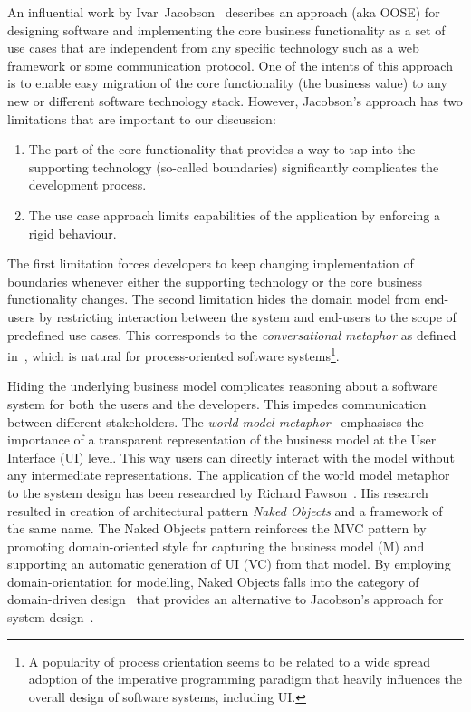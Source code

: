 \documentclass[a4paper,10pt,oneside,openright,final]{memoir} %
\begin{document}
    An influential work by Ivar~Jacobson~\cite{jacobson1992} describes an approach (aka OOSE) for designing software and implementing the core business functionality as a set of use cases that are independent from any specific technology such as a web framework or some communication protocol.
  	One of the intents of this approach is to enable easy migration of the core functionality (the business value) to any new or different software technology stack.
  	However, Jacobson's approach has two limitations that are important to our discussion:
	\begin{enumerate}
   		\item The part of the core functionality that provides a way to tap into the supporting technology (so-called boundaries) significantly complicates the development process.
   		\item The use case approach limits capabilities of the application by enforcing a rigid behaviour.
  	\end{enumerate}
  
	The first limitation forces developers to keep changing implementation of boundaries whenever either the supporting technology or the core business functionality changes.
	The second limitation hides the domain model from end-users by restricting interaction between the system and end-users to the scope of predefined use cases.
	This corresponds to the \emph{conversational metaphor} as defined in~\cite{HHN1986}, which is natural for process-oriented software systems\footnote{A popularity of process orientation seems to be related to a wide spread adoption of the imperative programming paradigm that heavily influences the overall design of software systems, including UI.}.

	Hiding the underlying business model complicates reasoning about a software system for both the users and the developers.
	This impedes communication between different stakeholders.  
	The \emph{world model metaphor}~\cite{HHN1986} emphasises the importance of a transparent representation of the business model at the User Interface (UI) level.
	This way users can directly interact with the model without any intermediate representations.
  	The application of the world model metaphor to the system design has been researched by Richard Pawson~\cite{pawson2001, pawson2004}.
  	His research resulted in creation of architectural pattern \emph{Naked Objects} and a framework of the same name.
  	The Naked Objects pattern reinforces the MVC pattern by promoting domain-oriented style for capturing the business model (M) and supporting an automatic generation of UI (VC) from that model.
  	By employing domain-orientation for modelling, Naked Objects falls into the category of domain-driven design~\cite{haywood2009} that provides an alternative to Jacobson's approach for system design~\cite{evans2003, vernon2013}.
    
\end{document}
